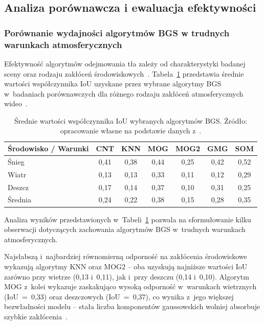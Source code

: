\subsection{Analiza porównawcza i ewaluacja efektywności}

\subsubsection{Porównanie wydajności algorytmów BGS w trudnych warunkach atmosferycznych}

Efektywność algorytmów odejmowania tła zależy od charakterystyki badanej sceny oraz rodzaju
zakłóceń środowiskowych~\cite{bouwmans2014}. Tabela~\ref{tab:iou_bgs_comparison} przedstawia
średnie wartości współczynnika IoU uzyskane przez wybrane algorytmy BGS w~badaniach porównawczych
dla różnego rodzaju zakłóceń atmosferycznych wideo~\cite{karbowiak2022}.

\begin{table}[htbp]
  \centering
  \caption{Średnie wartości współczynnika IoU wybranych algorytmów BGS. Żródło: opracowanie własne na podstawie danych z~\cite{karbowiak2022}.}
  \label{tab:iou_bgs_comparison}
  \begin{tabular}{|l|c|c|c|c|c|c|}
    \hline
    \textbf{Środowisko / Warunki}
            & \textbf{CNT} & \textbf{KNN} & \textbf{MOG} & \textbf{MOG2} & \textbf{GMG} & \textbf{SOM} \\ \hline
    Śnieg   & 0,41         & 0,38         & 0,44         & 0,25          & 0,42         & 0,52         \\ \hline
    Wiatr   & 0,13         & 0,13         & 0,33         & 0,11          & 0,12         & 0,29         \\ \hline
    Deszcz  & 0,17         & 0,14         & 0,37         & 0,10          & 0,31         & 0,25         \\ \hline
    Średnia & 0,24         & 0,22         & 0,38         & 0,15          & 0,28         & 0,35         \\ \hline
  \end{tabular}
\end{table}

Analiza wyników przedstawionych w~Tabeli~\ref{tab:iou_bgs_comparison} pozwala na sformułowanie
kilku obserwacji dotyczących zachowania algorytmów BGS w~trudnych warunkach atmosferycznych.

Najsłabszą i~najbardziej równomierną odporność na zakłócenia środowiskowe wykazują algorytmy KNN
oraz MOG2 -- oba uzyskują najniższe wartości IoU zarówno przy wietrze (0,13 i~0,11), jak i~przy
deszczu (0,14 i~0,10). Algorytm MOG z~kolei wykazuje zaskakująco wysoką odporność w~warunkach
wietrznych (IoU~=~0,33) oraz deszczowych (IoU~=~0,37), co wynika z~jego większej bezwładności
modelu -- stała liczba komponentów gaussowskich wolniej absorbuje szybkie
zakłócenia~\cite{stauffer1999}.

